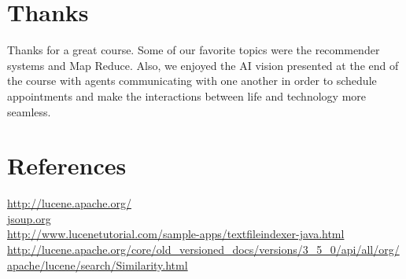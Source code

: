 \documentclass[12pt,letterpaper]{article}
\begin{document}
\section{Thanks}
Thanks for a great course. Some of our favorite topics were the recommender systems and Map Reduce. Also, we enjoyed the AI vision presented at the end of the course with agents communicating with one another in order to schedule appointments and make the interactions between life and technology more seamless.

\section{References}
\url{http://lucene.apache.org/} \\
\url{jsoup.org} \\
\url{http://www.lucenetutorial.com/sample-apps/textfileindexer-java.html} \\
\url{http://lucene.apache.org/core/old_versioned_docs/versions/3_5_0/api/all/org/apache/lucene/search/Similarity.html} \\
\end{document}

